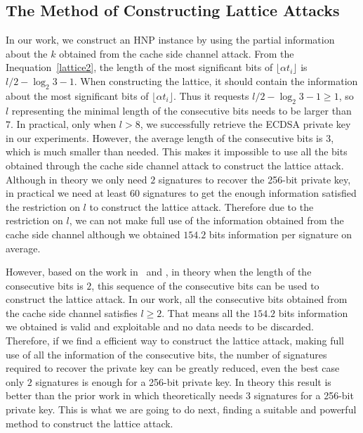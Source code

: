 \subsection{The Method of Constructing Lattice Attacks}
In our work, we construct an HNP instance by using the partial information about the $k$ obtained from the cache side channel attack.
 From the Inequation~\ref{lattice2}, the length of the most significant bits of $\lfloor\alpha t_i\rfloor$ is $l/2-\log_{2}{3} -1$.
When constructing the lattice, it should contain the information about the most significant bits of $\lfloor\alpha t_i\rfloor$.
Thus it requests $l/2-\log_{2}{3} -1 \geq 1$, so $l$ representing the minimal length of the consecutive bits needs to be larger than $7$.
In practical, only when $l > 8$, we successfully retrieve the ECDSA private key in our experiments.
However, the average length of the consecutive bits is $3$, which is much smaller than needed. 
This makes it impossible to use all the bits obtained through the cache side channel attack  to construct the lattice attack.
Although in theory we only need $2$ signatures to recover the 256-bit private key, 
 in practical we need at least $60$ signatures to get the enough information satisfied the restriction on $l$ to construct the lattice attack.
Therefore due to the restriction on $l$, we can not make full use of the information obtained from the cache side channel although we obtained $154.2$ bits information per signature on average.

However, based on the work in~\cite{Nguyen2002} and \cite{Liu2013}, 
 in theory when the length of the consecutive bits is $2$, this sequence of  the consecutive bits can be used to construct the lattice attack.
In our work, all the consecutive bits obtained from the cache side channel satisfies $l \geq 2$. 
 That means all the $154.2$ bits information we obtained is valid and exploitable and  no data needs to be discarded.
Therefore, if we find a efficient way to construct the lattice attack, making full use of all the information of the consecutive bits, 
   the number of signatures required to recover the private key can be greatly reduced, even the best case only $2$ signatures is enough for a 256-bit private key.
In theory this result is better than the prior work in \cite{Fan2016} which theoretically needs 3 signatures for a 256-bit private key.
This is what we are going to do next, finding a suitable and powerful method to construct the lattice attack.












